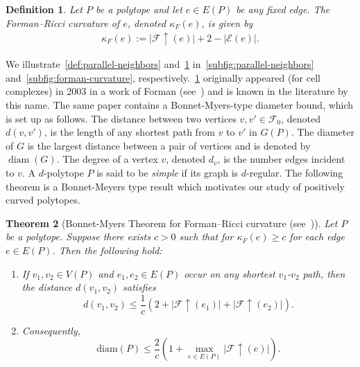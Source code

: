 \documentclass[11pt,a4paper]{amsart}
\newcommand{\diam}{\operatorname{diam}}
\newcommand{\forman}[1]{\kappa_F\left({#1}\right)}
\newtheorem{theorem}{Theorem}[section]
\newtheorem{definition}[theorem]{Definition}
\begin{document}
\begin{definition}\label{def:forman-curvature}
    Let $P$ be a polytope and let $e\in E(P)$ be any fixed edge. The {\normalfont Forman--Ricci curvature} of $e$, denoted $\forman{e}$, is given by
        \begin{align*}
            \forman{e} := |\mathcal{F}\uparrow(e)| + 2 - |\mathcal{E}(e)|.
        \end{align*}
\end{definition}

We illustrate~\cref{def:parallel-neighbors} and~\cref{def:forman-curvature} in~\cref{subfig:parallel-neighbors} and~\cref{subfig:forman-curvature}, respectively.~\cref{def:forman-curvature} originally appeared (for cell complexes) in 2003 in a work of Forman (see~\cite{forman}) and is known in the literature by this name. The same paper contains a Bonnet-Myers-type diameter bound, which is set up as follows. The distance between two vertices $v,v'\in\mathcal{F}_0$, denoted $d(v, v')$, is the length of any shortest path from $v$ to $v'$ in $G(P)$. The diameter of $G$ is the largest distance between a pair of vertices and is denoted by $\diam(G)$. The degree of a vertex $v$, denoted $d_v$, is the number edges incident to $v$. A $d$-polytope $P$ is said to be \emph{simple} if its graph is $d$-regular. The following theorem is a Bonnet-Meyers type result which motivates our study of positively curved polytopes.

\begin{theorem}[Bonnet-Myers Theorem for Forman--Ricci curvature (see~\cite{forman})] \label{thm: forman diam}
    Let $P$ be a polytope. Suppose there exists $c > 0$ such that for  $\forman{e} \geq c$ for each edge $e\in E(P)$. Then the following hold:
        \begin{enumerate}[label=(\roman*)]
            \item If $v_1, v_2\in V(P)$ and $e_1, e_2\in E(P)$ occur on any shortest $v_1$-$v_2$ path, then the distance $d(v_1, v_2)$ satisfies
                \[
                d(v_1, v_2)\leq \frac{1}c\left(2 + |\mathcal{F}\uparrow(e_1)| + |\mathcal{F}\uparrow(e_2)| \right).
                \]
            \item Consequently,
                \[
                \mathrm{diam}(P) \leq \frac{2}{c}\left(1+\max_{e\in E(P)}|\mathcal{F}\uparrow(e)| \right).
                \]
        \end{enumerate}
\end{theorem}
\end{document}
